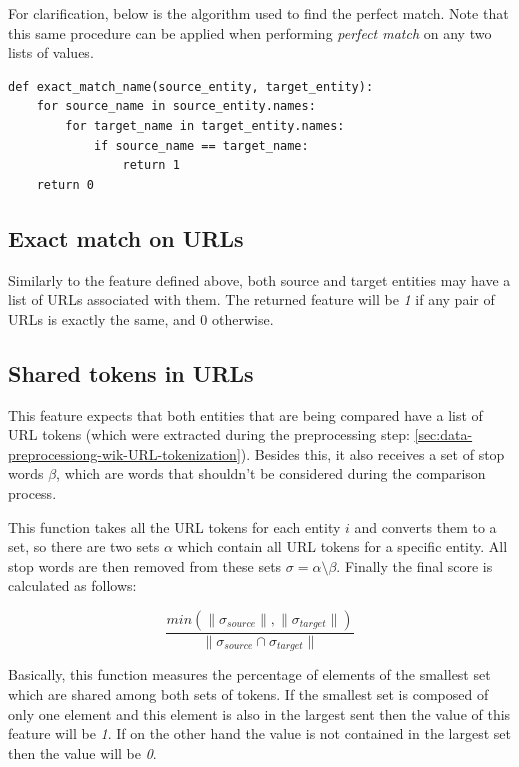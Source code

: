 \documentclass[epsfig,a4paper,11pt,titlepage,twoside,openany]{book}
\begin{document}
For clarification, below is the algorithm used to find the perfect match. Note that this same procedure can be applied when performing \textit{perfect match} on any two lists of values.

\begin{lstlisting}
def exact_match_name(source_entity, target_entity):
    for source_name in source_entity.names:
        for target_name in target_entity.names:
            if source_name == target_name:
                return 1
    return 0
\end{lstlisting}

\subsection{Exact match on URLs}
\label{sec:feature-exact-match-urls}

Similarly to the feature defined above, both source and target entities may have a list of URLs associated with them. The returned feature will be \textit{1} if any pair of URLs is exactly the same, and 0 otherwise.

\subsection{Shared tokens in URLs}
\label{sec:feature-shared-tokens-plus-urls}

This feature expects that both entities that are being compared have a list of URL tokens (which were extracted during the preprocessing step: \autoref{sec:data-preprocessiong-wik-URL-tokenization}). Besides this, it also receives a set of stop words $\beta$, which are words that shouldn't be considered during the comparison process.

This function takes all the URL tokens for each entity $i$ and converts them to a set, so there are two sets $\alpha$ which contain all URL tokens for a specific entity. All stop words are then removed from these sets $\sigma = \alpha
\setminus \beta$. Finally the final score is calculated as follows:

\begin{equation*}
    \frac{
        min(\|\sigma_{source}\|, \|\sigma_{target}\|)}
        {\|\sigma_{source} \cap \sigma_{target}\|}
\end{equation*}

Basically, this function measures the percentage of elements of the smallest set which are shared among both sets of tokens. If the smallest set is composed of only one element and this element is also in the largest sent then the value of this feature will be \textit{1}. If on the other hand the value is not contained in the largest set then the value will be \textit{0}.
\end{document}
